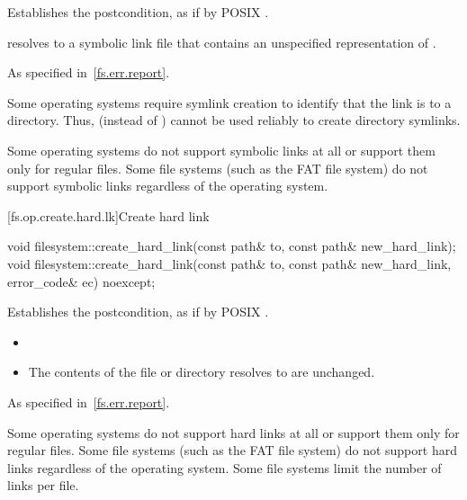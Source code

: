 \begin{itemdescr}
\pnum
\effects
Establishes the postcondition, as if by POSIX .

\pnum
\ensures
{} resolves to a symbolic link file that
  contains an unspecified representation of .

\pnum
\throws
As specified in~\ref{fs.err.report}.

\pnum
\begin{note}
Some operating systems require symlink creation to
identify that the link is to a directory.
Thus,  (instead of )
cannot be used reliably to create directory symlinks.
\end{note}

\pnum
\begin{note}
Some operating systems do not support symbolic links at all or support
  them only for regular files.
  Some file systems (such as the FAT file system) do not
  support
  symbolic links regardless of the operating system.
\end{note}
\end{itemdescr}

[fs.op.create.hard.lk]{Create hard link}

%
\begin{itemdecl}
void filesystem::create_hard_link(const path& to, const path& new_hard_link);
void filesystem::create_hard_link(const path& to, const path& new_hard_link,
                                      error_code& ec) noexcept;
\end{itemdecl}

\begin{itemdescr}
\pnum
\effects
Establishes the postcondition, as if by POSIX .

\pnum
\ensures
\begin{itemize}
\item {}
\item The contents of the file or directory
     resolves to are unchanged.
\end{itemize}

\pnum
\throws
As specified in~\ref{fs.err.report}.

\pnum
\begin{note}
Some operating systems do not support hard links at all or support
  them only for regular files. Some file systems (such as the FAT file system)
  do not support hard links regardless of the operating system.
  Some file systems limit the number of links per file.
\end{note}
\end{itemdescr}

